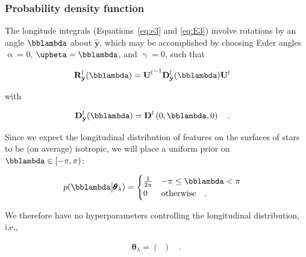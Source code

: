 \documentclass[modern,linenumbers]{aastex62}
\begin{document}
\subsubsection{Probability density function}
%
The longitude integrals (Equations~\ref{eq:e3} and \ref{eq:E3}) involve
rotations by an angle $\bblambda$ about $\hat{\mathbf{y}}$, which
may be accomplished by choosing
Euler angles $\upalpha = 0$, $\upbeta = \bblambda$, and
$\upgamma = 0$, such that
%
\begin{linenomath}\begin{align}
        \mathbf{R}^l_{\hat{\mathbf{y}}}(\bblambda)
         & =
        {\mathbf{U}^l}^{-1} \mathbf{D}^l_{\hat{\mathbf{y}}}(\bblambda) \mathbf{U}^l
    \end{align}\end{linenomath}
%
with
\begin{linenomath}\begin{align}
        \mathbf{D}^l_{\hat{\mathbf{y}}}(\bblambda)
         & =
        \mathbf{D}^l\left(0, \bblambda, 0\right)
        \quad.
    \end{align}\end{linenomath}
%
Since we expect the longitudinal distribution of features on the surfaces
of stars to be (on average) isotropic, we will place a uniform prior on
$\bblambda \in [-\pi, \pi)$:
%
\begin{linenomath}\begin{align}
        p(\bblambda \big| \pmb{\theta}_\lambda)
         & =
        \begin{cases}
            \frac{1}{2\pi} & -\pi \leq \bblambda < \pi
            \\
            0              & \mathrm{otherwise} \quad.
        \end{cases}
    \end{align}\end{linenomath}
%
We therefore have no hyperparameters
controlling the longitudinal distribution, i.e.,
%
\begin{linenomath}\begin{align}
        \pmb{\theta}_\lambda = \left( \,\,\, \right)
        \quad.
    \end{align}\end{linenomath}
%
\end{document}
